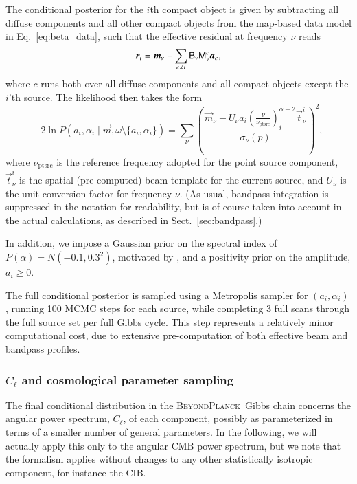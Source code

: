 \documentclass[twocolumn]{aa}
\renewcommand{\t}[0]{\vec{t}}
\renewcommand{\a}[0]{\vec{a}}
\newcommand{\m}[0]{\vec{m}}
\newcommand{\B}[0]{\tens{B}}
\newcommand{\M}[0]{\tens{M}}
\renewcommand{\r}[0]{\vec{r}}
\newcommand{\BP}{\textsc{BeyondPlanck}}
\begin{document}
The conditional posterior for the $i$th compact object is given by
subtracting all diffuse components and all other compact objects from
the map-based data model in Eq.~\eqref{eq:beta_data}, such that the
effective residual at frequency $\nu$ reads
\begin{equation}
  \r_{i} = \m_{\nu} - \sum_{c\ne i} \B_{\nu}\M^c_{\nu}\a_c,
\end{equation}
where $c$ runs both over all diffuse components and all compact
objects except the $i$'th source. The likelihood then takes the form
\begin{equation}
  -2\ln P(a_i, \alpha_i\mid \m, \omega\setminus \{a_i, \alpha_i\}) =
  \sum_{\nu}\left(\frac{\m_{\nu} - U_\nu
    a_i\left(\frac{\nu}{\nu_{\mathrm{ptsrc}}}\right)^{\alpha-2}_i \t_{\nu}^i}{\sigma_{\nu}(p)}\right)^2,
\label{eq:lnL_likelihood}
\end{equation}
where $\nu_{\mathrm{ptsrc}}$ is the reference frequency adopted for
the point source component, $\t_\nu^i$ is the spatial (pre-computed)
beam template for the current source, and $U_\nu$ is the unit
conversion factor for frequency $\nu$. (As usual, bandpass integration
is suppressed in the notation for readability, but is of course taken
into account in the actual calculations, as described in
Sect.~\ref{sec:bandpass}.) 

In addition, we impose a Gaussian prior on the spectral index of
$P(\alpha) = N(-0.1,0.3^2)$, motivated by \citet{bennett2012}, and a
positivity prior on the amplitude, $a_i \ge 0$.

The full conditional posterior is sampled using a Metropolis sampler
for $(a_i, \alpha_i)$, running 100 MCMC steps for each source, while
completing 3 full scans through the full source set per full Gibbs
cycle. This step represents a relatively minor computational cost, due
to extensive pre-computation of both effective beam and bandpass
profiles.

\subsubsection{$C_{\ell}$ and cosmological parameter sampling}
\label{sec:powspec}  

The final conditional distribution in the \BP\ Gibbs chain concerns
the angular power spectrum, $C_{\ell}$, of each component, possibly as
parameterized in terms of a smaller number of general parameters. In
the following, we will actually apply this only to the angular CMB
power spectrum, but we note that the formalism applies without changes to
any other statistically isotropic component, for instance the CIB.
\end{document}
